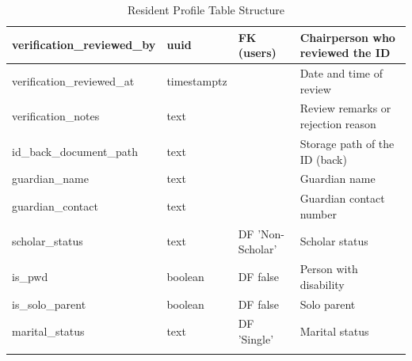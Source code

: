 \begin{longtable}{|p{3.2cm}|p{2.2cm}|p{3.2cm}|p{5.4cm}|}
verification\_reviewed\_by & uuid & FK (users) & Chairperson who reviewed the ID \\ \hline
verification\_reviewed\_at & timestamptz & & Date and time of review \\ \hline
verification\_notes & text & & Review remarks or rejection reason \\ \hline
id\_back\_document\_path & text & & Storage path of the ID (back) \\ \hline
guardian\_name & text & & Guardian name \\ \hline
guardian\_contact & text & & Guardian contact number \\ \hline
scholar\_status & text & DF 'Non-Scholar' & Scholar status \\ \hline
is\_pwd & boolean & DF false & Person with disability \\ \hline
is\_solo\_parent & boolean & DF false & Solo parent \\ \hline
marital\_status & text & DF 'Single' & Marital status \\ \hline
\caption{Resident Profile Table Structure}
\label{tab:resident_profile}
\end{longtable}
\vspace{3mm}

